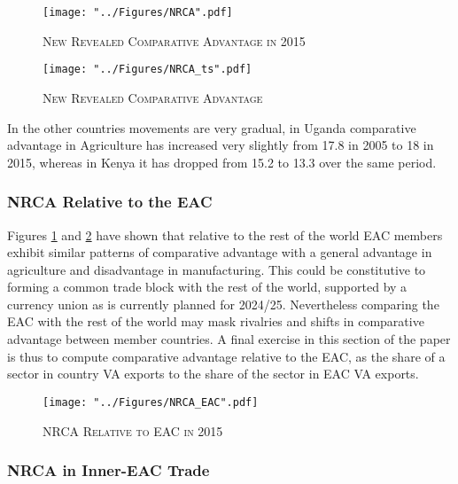 \documentclass[a4paper]{article}
\begin{document}
\begin{figure}[h!]
\centering
\caption{\label{fig:NRCA}\textsc{New Revealed Comparative Advantage in 2015}}
\texttt{[image: "../Figures/NRCA".pdf]} %
\end{figure}
\FloatBarrier


\begin{figure}[h!]
\centering
\caption{\label{fig:NRCA_ts}\textsc{New Revealed Comparative Advantage}}
\texttt{[image: "../Figures/NRCA\_ts".pdf]} %
\end{figure}
\FloatBarrier

In the other countries movements are very gradual, in Uganda comparative advantage in Agriculture has increased very slightly from 17.8 in 2005 to 18 in 2015, whereas in Kenya it has dropped from 15.2 to 13.3 over the same period. 


\subsubsection{NRCA Relative to the EAC}
Figures \ref{fig:NRCA} and \ref{fig:NRCA_ts} have shown that relative to the rest of the world EAC members exhibit similar patterns of comparative advantage with a general advantage in agriculture and disadvantage in manufacturing. This could be constitutive to forming a common trade block with the rest of the world, supported by a currency union as is currently planned for 2024/25. Nevertheless comparing the EAC with the rest of the world may mask rivalries and shifts in comparative advantage between member countries. A final exercise in this section of the paper is thus to compute comparative advantage relative to the EAC, as the share of a sector in country VA exports to the share of the sector in EAC VA exports. 


\begin{figure}[h!]
\centering
\caption{\label{fig:NRCA_EAC}\textsc{NRCA Relative to EAC in 2015}}
\texttt{[image: "../Figures/NRCA\_EAC".pdf]} %
\end{figure}
\FloatBarrier

\subsubsection{NRCA in Inner-EAC Trade}
\end{document}
